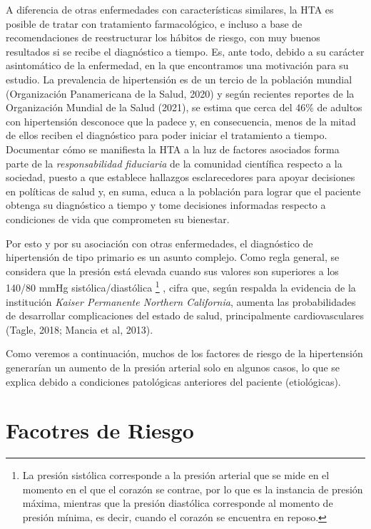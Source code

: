 \documentclass{aa}
\newcounter{daggerfootnote}
\newcommand*{\daggerfootnote}[1]{%
    \setcounter{daggerfootnote}{\value{footnote}}%
    \renewcommand*{\thefootnote}{\fnsymbol{footnote}}%
    \footnote[2]{#1}%
    \setcounter{footnote}{\value{daggerfootnote}}%
    \renewcommand*{\thefootnote}{\arabic{footnote}}%
    }
\begin{document}
A diferencia de otras enfermedades con características similares, la HTA es posible de tratar con tratamiento farmacológico, e incluso a base de recomendaciones de reestructurar los hábitos de riesgo, con muy buenos resultados si se recibe el diagnóstico a tiempo. Es, ante todo, debido a su carácter asintomático de la enfermedad, en la que encontramos una motivación para su estudio. La prevalencia de hipertensión es de un tercio de la población mundial (Organización Panamericana de la Salud, 2020) y según recientes reportes de la Organización Mundial de la Salud (2021), se estima que cerca del 46\% de adultos con hipertensión desconoce que la padece y, en consecuencia, menos de la mitad de ellos reciben el diagnóstico para poder iniciar el tratamiento a tiempo. Documentar  cómo se manifiesta la HTA a la luz de factores asociados forma parte de la \textit{responsabilidad fiduciaria} de la comunidad científica respecto a la sociedad, puesto a que establece hallazgos esclarecedores para apoyar decisiones en políticas de salud y, en suma, educa a la población para lograr que el paciente obtenga su diagnóstico a tiempo y tome decisiones informadas respecto a condiciones de vida que comprometen su bienestar.

Por esto y por su asociación con otras enfermedades, el diagnóstico de hipertensión de tipo primario es un asunto complejo. Como regla general, se considera que la presión está elevada cuando sus valores son superiores a los 140/80 mmHg sistólica/diastólica\daggerfootnote{La presión sistólica corresponde a la presión arterial que se mide en el momento en el que el corazón se contrae, por lo que es la instancia de presión máxima, mientras que la presión diastólica corresponde al momento de presión mínima, es decir, cuando el corazón se encuentra en reposo.}, cifra que, según respalda la evidencia de la institución \textit{Kaiser Permanente Northern California}, aumenta las probabilidades de desarrollar complicaciones del estado de salud, principalmente cardiovasculares (Tagle, 2018; Mancia et al, 2013).

Como veremos a continuación, muchos de los factores de riesgo de la hipertensión generarían un aumento de la presión arterial solo en algunos casos, lo que se explica debido a condiciones patológicas anteriores del paciente (etiológicas).

\section{Facotres de Riesgo}
\end{document}
